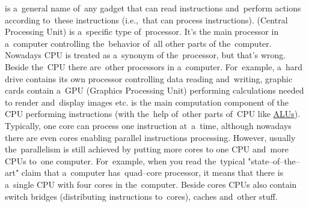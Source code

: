 \label{processorcpucore}
\begin{itemize}
     is a~general name of~any gadget that can read instructions and~perform actions according to~these instructions (i.e.,~that can process instructions).
     (Central Processing Unit) is a~specific type of~processor.
            It's the main processor in a~computer controlling the~behavior of~all other parts of the~computer.
            Nowadays CPU is treated as a~synonym of the~processor, but that's wrong.
            Beside the~CPU there are~other processors in a~computer.
            For~example, a~hard drive contains its own processor controlling data reading and~writing, graphic cards contain a~GPU (Graphics Processing Unit) performing calculations needed to render and~display images etc.
     is the main computation component of the CPU performing instructions (with the~help of~other parts of~CPU like \hyperref[alu]{ALUs}).
            Typically, one core can process one instruction at~a~time, although nowadays there are even cores enabling parallel instructions processing.
            However, usually the~parallelism is still achieved by putting more cores to one CPU and~more CPUs to~one computer.
            For~example, when you read the~typical "state--of--the--art" claim that a~computer has~quad--core processor, it means that there is a~single CPU with four cores in the~computer.
            Beside cores CPUs also contain switch bridges (distributing instructions to~cores), caches and~other stuff.
\end{itemize}
